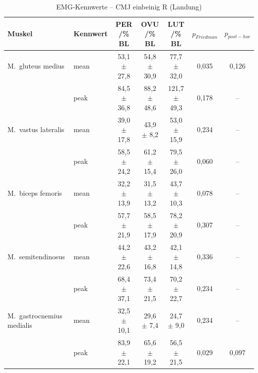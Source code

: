 \begin{table}[H]
  \centering
  \caption{EMG-Kennwerte – CMJ einbeinig R (Landung)}
  \label{tab:CMJ_einbeinig_R_Landung}
  \small
  \begin{tabular}{l l c c c c c }
    \hline
\textbf{Muskel} & \textbf{Kennwert} & \textbf{PER /\% BL} & \textbf{OVU /\% BL} & \textbf{LUT /\% BL} & \textbf{$p_{Friedman}$} & \textbf{$p_{post-hoc}$} \\
    \hline
    M.~gluteus medius & mean & 53{,}1 $\pm$ 27{,}8 & 54{,}8 $\pm$ 30{,}9 & 77{,}7 $\pm$ 32{,}0 & 0{,}035 & 0{,}126\\
     & peak & 84{,}5 $\pm$ 36{,}8 & 88{,}2 $\pm$ 48{,}6 & 121{,}7 $\pm$ 49{,}3 & 0{,}178 & --\\
    \hline
    M.~vastus lateralis & mean & 39{,}0 $\pm$ 17{,}8 & 43{,}9 $\pm$ 8{,}2 & 53{,}0 $\pm$ 15{,}9 & 0{,}234 & --\\
     & peak & 58{,}5 $\pm$ 24{,}2 & 61{,}2 $\pm$ 15{,}4 & 79{,}5 $\pm$ 26{,}0 & 0{,}060 & --\\
    \hline
    M.~biceps femoris & mean & 32{,}2 $\pm$ 13{,}9 & 31{,}5 $\pm$ 13{,}2 & 43{,}7 $\pm$ 10{,}3 & 0{,}078 & --\\
     & peak & 57{,}7 $\pm$ 21{,}9 & 58{,}5 $\pm$ 17{,}9 & 78{,}2 $\pm$ 20{,}9 & 0{,}307 & --\\
    \hline
    M.~semitendinosus & mean & 44{,}2 $\pm$ 22{,}6 & 43{,}2 $\pm$ 16{,}8 & 42{,}1 $\pm$ 14{,}8 & 0{,}336 & --\\
     & peak & 68{,}4 $\pm$ 37{,}1 & 73{,}4 $\pm$ 21{,}5 & 70{,}2 $\pm$ 22{,}7 & 0{,}234 & --\\
    \hline
    M.~gastrocnemius medialis & mean & 32{,}5 $\pm$ 10{,}1 & 29{,}6 $\pm$ 7{,}4 & 24{,}7 $\pm$ 9{,}0 & 0{,}234 & --\\
     & peak & 83{,}9 $\pm$ 22{,}1 & 65{,}6 $\pm$ 19{,}2 & 56{,}5 $\pm$ 21{,}5 & 0{,}029 & 0{,}097\\
    \hline
  \end{tabular}
\end{table}

